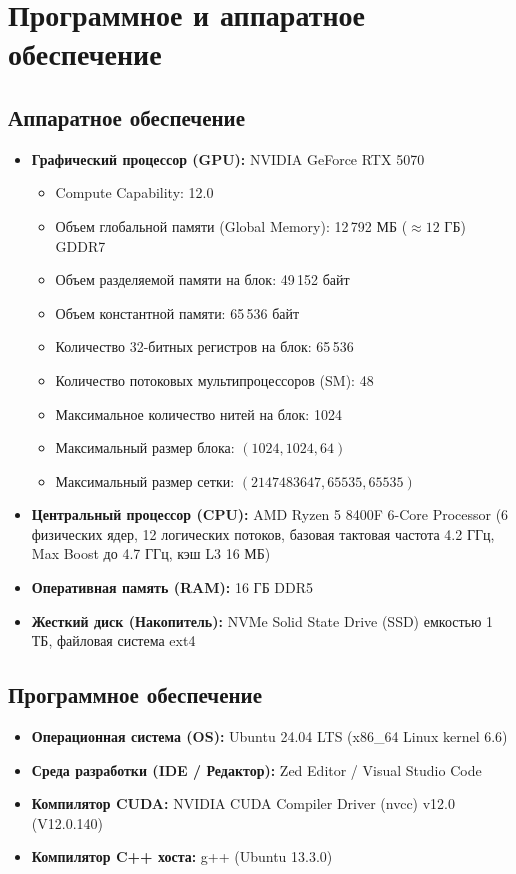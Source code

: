 \documentclass[12pt,a4paper]{article}
\begin{document}
\section{Программное и аппаратное обеспечение}
\subsection*{Аппаратное обеспечение}
\begin{itemize}
    \item \textbf{Графический процессор (GPU):} NVIDIA GeForce RTX 5070
    \begin{itemize}
        \item Compute Capability: 12.0
        \item Объем глобальной памяти (Global Memory): 12\,792 МБ ($\approx 12$ ГБ) GDDR7
        \item Объем разделяемой памяти на блок: 49\,152 байт
        \item Объем константной памяти: 65\,536 байт
        \item Количество 32-битных регистров на блок: 65\,536
        \item Количество потоковых мультипроцессоров (SM): 48
        \item Максимальное количество нитей на блок: 1024
        \item Максимальный размер блока: $(1024, 1024, 64)$
        \item Максимальный размер сетки: $(2147483647, 65535, 65535)$
    \end{itemize}
    \item \textbf{Центральный процессор (CPU):} AMD Ryzen 5 8400F 6-Core Processor (6 физических ядер, 12 логических потоков, базовая тактовая частота 4.2 ГГц, Max Boost до 4.7 ГГц, кэш L3 16 МБ)
    \item \textbf{Оперативная память (RAM):} 16 ГБ DDR5
    \item \textbf{Жесткий диск (Накопитель):} NVMe Solid State Drive (SSD) емкостью 1 ТБ, файловая система ext4
\end{itemize}

\subsection*{Программное обеспечение}
\begin{itemize}
    \item \textbf{Операционная система (OS):} Ubuntu 24.04 LTS (x86\_64 Linux kernel 6.6)
    \item \textbf{Среда разработки (IDE / Редактор):} Zed Editor / Visual Studio Code
    \item \textbf{Компилятор CUDA:} NVIDIA CUDA Compiler Driver (nvcc) v12.0 (V12.0.140)
    \item \textbf{Компилятор C++ хоста:} g++ (Ubuntu 13.3.0)
\end{itemize}
\end{document}
